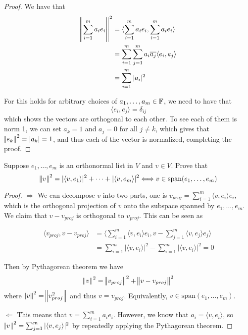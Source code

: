 \documentclass{extarticle}
\begin{document}
\begin{proof}
We have that 
\begin{align*}
    \norm{\sum_{i=1}^{m} a_i e_i}^2 
    &= \langle \sum_{i=1}^{m} a_i e_i , \sum_{i=1}^{m} a_i e_i \rangle    \\ 
    &= \sum_{i=1}^{m} \sum_{j=1}^{m} a_i \overline{a_j} \langle e_i, e_j \rangle  \\ 
    &= \sum_{i=1}^{m} |a_i|^2 
\end{align*}

For this holds for arbitrary choices of \(a_1, \ldots, a_m \in \mathbb{F}\), we need to have that 
\[\langle e_i,e_j \rangle = \delta_{ij}\]
which shows the vectors are orthogonal to each other. To see each of them is norm 1, we can 
set \(a_k = 1\) and \(a_j = 0\) for all \(j \neq k\), which gives that \(\norm{e_k}^2 = |a_k| = 1\), and 
thus each of the vector is normalized, completing the proof. 
\end{proof}


\begin{problem}{3}
    Suppose \(e_1, \ldots, e_m\) is an orthonormal list in \(V\) and \(v \in V\). Prove that 
    \[\norm{v}^2 = |\langle v,e_1 \rangle|^2 + \cdots + |\langle v,e_m \rangle|^2 
    \Longleftrightarrow v \in \text{span}(e_1, \ldots, e_m)\]
\end{problem}

\begin{proof}
\(\Rightarrow\) We can decompose \(v\) into two parts, one is \(v_{proj} = \sum_{i=1}^{m} 
\langle v,e_i \rangle e_i\), which is the orthogonal projection of \(v\) onto the subspace 
spanned by \(e_1, \ldots, e_m\). We claim that \(v - v_{proj}\) is orthogonal to \(v_{proj}\). 
This can be seen as 

\begin{align*}
    \langle v_{proj}, v - v_{proj} \rangle 
    &= \langle \sum_{i=1}^{m} \langle v,e_i \rangle e_i, v - \sum_{j=1}^{m} \langle v,e_j \rangle e_j \rangle \\ 
    &= \sum_{i=1}^{m} |\langle v,e_i \rangle|^2 - \sum_{i=1}^{m} |\langle v,e_i \rangle|^2 = 0 
\end{align*}

Then by Pythagorean theorem we have 
\[\norm{v}^2 = \norm{v_{proj}}^2 + \norm{v - v_{proj}}^2 \] 
where \(\norm{v}^2 = \norm{v_{proj}^2}\) and thus \(v = v_{proj}\). Equivalently, \(v \in \text{span} 
(e_1, \ldots, e_m)\).

\(\Leftarrow\) This means that \(v = \sum_{i=1}^{m} a_i e_i\). However, we know that 
\(a_i = \langle v,e_i \rangle\), so \(\norm{v}^2 = \sum_{j=1}^{m} |\langle v,e_j \rangle|^2\) by 
repeatedly applying the Pythagorean theorem. 
\end{proof}
\end{document}
